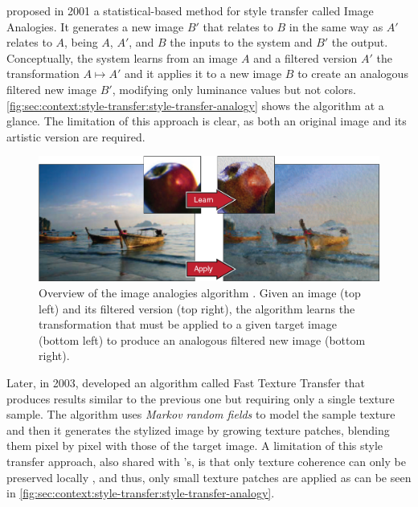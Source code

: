 \citet{Hertzmann2001} proposed in 2001 a statistical-based method for style transfer called Image Analogies.
It generates a new image $B'$ that relates to $B$ in the same way as $A'$ relates to $A$, being $A$, $A'$, and $B$ the inputs to the system and $B'$ the output.
Conceptually, the system learns from an image $A$ and a filtered version $A'$ the transformation $A \mapsto A'$ and it applies it to a new image $B$ to create an analogous filtered new image $B'$, modifying only luminance values but not colors.
\autoref{fig:sec:context:style-transfer:style-transfer-analogy} shows the algorithm at a glance.
The limitation of this approach is clear, as both an original image and its artistic version are required.

\begin{figure}[htbp]
  \includegraphics[width=\textwidth]{gfx/style-transfer-analogy}
  \caption{
    Overview of the image analogies algorithm \cite{Hertzmann2001}.
    Given an image (top left) and its filtered version (top right), the algorithm learns the transformation that must be applied to a given target image (bottom left) to produce an analogous filtered new image (bottom right).
  }
  \label{fig:sec:context:style-transfer:style-transfer-analogy}
\end{figure}

Later, in 2003, \citet{Ashikhmin2003} developed an algorithm called Fast Texture Transfer that produces results similar to the previous one but requiring only a single texture sample.
The algorithm uses \emph{Markov random fields} to model the sample texture and then it generates the stylized image by growing texture patches, blending them pixel by pixel with those of the target image.
A limitation of this style transfer approach, also shared with \citeauthor{Hertzmann2001}'s, is that only texture coherence can only be preserved locally \cite{Lee2010}, and thus, only small texture patches are applied as can be seen in \autoref{fig:sec:context:style-transfer:style-transfer-analogy}.

